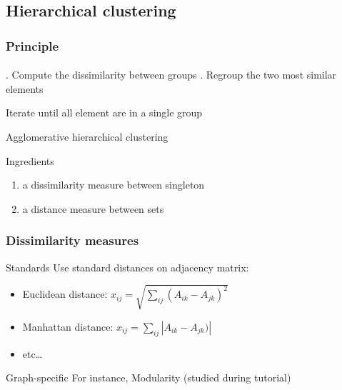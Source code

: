 \documentclass{beamer}\usepackage[]{graphicx}\usepackage[]{color}
\begin{document}
\subsection{Hierarchical clustering}

\begin{frame}
  \frametitle{Principle}
  \framesubtitle{}


  \begin{algorithm}[H]
    \BlankLine\BlankLine
    . Compute the dissimilarity between groups . Regroup the two most similar elements \;
      
      Iterate until all element are in a single group \;
    \BlankLine\BlankLine

    \caption{Agglomerative hierarchical clustering}
  \end{algorithm}
  
  \begin{block}{Ingredients}
    \begin{enumerate}
      \item a dissimilarity measure between singleton
      \item a distance measure between sets
    \end{enumerate}
  \end{block}

\end{frame}

\begin{frame}
  \frametitle{Dissimilarity measures}

  \begin{block}{Standards}
    Use standard distances on adjacency matrix:
    \begin{itemize}
      \item Euclidean distance: $\displaystyle x_{ij} = \sqrt{\sum_{ij} (A_{ik} - A_{jk})^2} $
      \item Manhattan distance: $\displaystyle x_{ij} = \sum_{ij} |A_{ik} - A_{jk})| $
      \item  etc\dots
    \end{itemize}  
  \end{block}

  \vfill

  \begin{block}{Graph-specific}
    For instance,  Modularity (studied during tutorial)
  \end{block}
  
\end{frame}
\end{document}
